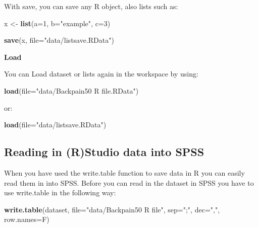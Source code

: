 \documentclass[]{book}
\newenvironment{Shaded}{\begin{snugshade}}{\end{snugshade}}
\newcommand{\KeywordTok}[1]{\textcolor[rgb]{0.13,0.29,0.53}{\textbf{#1}}}
\newcommand{\DataTypeTok}[1]{\textcolor[rgb]{0.13,0.29,0.53}{#1}}
\newcommand{\DecValTok}[1]{\textcolor[rgb]{0.00,0.00,0.81}{#1}}
\newcommand{\StringTok}[1]{\textcolor[rgb]{0.31,0.60,0.02}{#1}}
\newcommand{\NormalTok}[1]{#1}
\begin{document}
With save, you can save any R object, also lists such as:

\begin{Shaded}
\begin{Highlighting}[]
\NormalTok{x <-}\StringTok{ }\KeywordTok{list}\NormalTok{(}\DataTypeTok{a=}\DecValTok{1}\NormalTok{, }\DataTypeTok{b=}\StringTok{"example"}\NormalTok{, }\DataTypeTok{c=}\DecValTok{3}\NormalTok{)}

\KeywordTok{save}\NormalTok{(x, }\DataTypeTok{file=}\StringTok{"data/listsave.RData"}\NormalTok{)}
\end{Highlighting}
\end{Shaded}

\textbf{Load}

You can Load dataset or lists again in the workspace by using:

\begin{Shaded}
\begin{Highlighting}[]
\KeywordTok{load}\NormalTok{(}\DataTypeTok{file=}\StringTok{"data/Backpain50 R file.RData"}\NormalTok{)}
\end{Highlighting}
\end{Shaded}

or:

\begin{Shaded}
\begin{Highlighting}[]
\KeywordTok{load}\NormalTok{(}\DataTypeTok{file=}\StringTok{"data/listsave.RData"}\NormalTok{)}
\end{Highlighting}
\end{Shaded}

\subsection{Reading in (R)Studio data into
SPSS}\label{reading-in-rstudio-data-into-spss}

When you have used the write.table function to save data in R you can
easily read them in into SPSS. Before you can read in the dataset in
SPSS you have to use write.table in the following way:

\begin{Shaded}
\begin{Highlighting}[]
\KeywordTok{write.table}\NormalTok{(dataset, }\DataTypeTok{file=}\StringTok{"data/Backpain50 R file"}\NormalTok{, }\DataTypeTok{sep=}\StringTok{";"}\NormalTok{, }\DataTypeTok{dec=}\StringTok{","}\NormalTok{, }\DataTypeTok{row.names=}\NormalTok{F)}
\end{Highlighting}
\end{Shaded}
\end{document}
